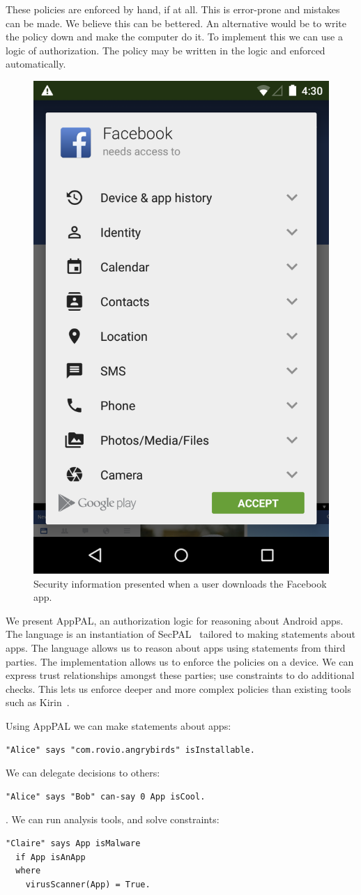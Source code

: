 \documentclass[twoside,letterpaper]{soups}
\newcommand{\comment}[1]{}%
\begin{document}
These policies are enforced by hand, if at all.
This is error-prone and mistakes can be made.
We believe this can be bettered.
An alternative would be to write the policy down and make the computer do it.
To implement this we can use a logic of authorization.
The policy may be written in the logic and enforced automatically.

\begin{figure}
  \centering
  \includegraphics[width=0.3\linewidth]{figures/facebook.png}
  \caption{Security information presented when a user downloads the Facebook app.}
\label{fig:facebook}
\end{figure}

We present AppPAL, an authorization logic for reasoning about Android apps.
The language is an instantiation of SecPAL~\citep{Becker:2006vh} tailored to making statements about apps.
The language allows us to reason about apps using statements from third parties.
The implementation allows us to enforce the policies on a device.
We can express trust relationships amongst these parties; use constraints to do additional checks.
This lets us enforce deeper and more complex policies than existing tools such as Kirin~\citep{Enck:2009ko}.

Using AppPAL we can make statements about apps:
\begin{lstlisting}
"Alice" says "com.rovio.angrybirds" isInstallable.
\end{lstlisting}
We can delegate decisions to others:
\begin{lstlisting}
"Alice" says "Bob" can-say 0 App isCool.
\end{lstlisting}.
We can run analysis tools, and solve constraints:
\begin{lstlisting}
"Claire" says App isMalware
  if App isAnApp
  where
    virusScanner(App) = True.
\end{lstlisting}
\end{document}
